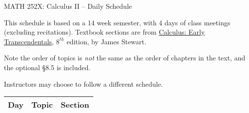 \documentclass[11pt]{article}
\begin{document}
\centerline{MATH 252X: Calculus II -- Daily Schedule}

\bigskip

This schedule is based on a 14 week semester, with 4 days of class meetings (excluding recitations). Textbook sections are from \underline{Calculus: Early Transcendentals}, $8^{th}$ edition, by James Stewart.


Note the order of topics is \emph{not} the same as the order of chapters in the text, and the optional \S8.5 is included. 

Instructors may choose to follow a different schedule. 

\bigskip

\centering
\begin{tabular}{|l|l|l|} %
\hline
Day& Topic &  Section\\
\hline 


\end{tabular}
\end{document}
